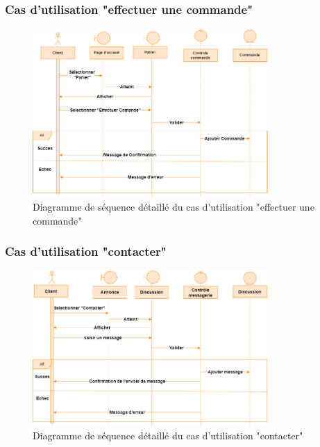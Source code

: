 \documentclass[edit,12pt,a4paper,ChapStyle,oneside,doubleinterligne]{report}
\begin{document}
\subsubsection{Cas d'utilisation "effectuer une commande"}
\begin{figure}[H]\label{fig:Diagramme cas 4d}
\centering
\includegraphics[width=0.8\textwidth]{images/Effectuer une commande d.png}
\caption{Diagramme de séquence détaillé du cas d'utilisation "effectuer une commande"}
\end{figure}


\newpage
\subsubsection{Cas d'utilisation "contacter"}
\begin{figure}[h!]\label{fig:Diagramme cas 5d}
\centering
\includegraphics[width=0.8\textwidth]{images/contacter d.png}
\caption{Diagramme de séquence détaillé du cas d'utilisation "contacter"}
\end{figure}
\end{document}
